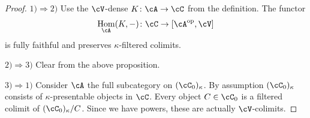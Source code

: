 \documentclass[a4paper,11pt,oneside,openany]{scrbook}
\newcommand{\from}{\colon}
\DeclareMathOperator{\Hom}{\text{Hom}}
\DeclareMathOperator{\op}{\text{op}}
\theoremstyle{definition}
\theoremstyle{definition}
\begin{document}
\begin{proof}
\item[$ 1)\Rightarrow 2) $]
    Use the $ \cV $-dense $ K \from \cA \to \cC $ from the definition.
    The functor
    \begin{displaymath}
	\Hom_{\cA}(K,-)\from \cC \to [\cA^{\op},\cV]
    \end{displaymath}
    is fully faithful and preserves $ \kappa $-filtered colimits.
\item[$ 2) \Rightarrow 3) $]
    Clear from the above proposition.
\item[$ 3) \Rightarrow 1) $]
    Consider $ \cA $ the full subcategory on $ (\cC_0)_\kappa $.
    By assumption $ (\cC_0)_\kappa $ consists of $ \kappa $-presentable objects in $ \cC $.
    Every object $ C \in\cC_0 $ is a filtered colimit of $ (\cC_0)_\kappa / C $.
    Since we have powers, these are actually $ \cV $-colimits.
\end{proof}

		\backmatter
	
\end{document}
